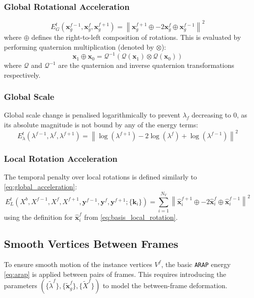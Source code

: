 \documentclass[a4paper,10pt]{article}
\newcommand{\mb}{\mathbf}
\begin{document}
\subsubsection*{Global Rotational Acceleration}
\begin{equation}
\label{eq:global_acceleration}
E^t_G(\mb{x}_g^{f-1}, \mb{x}_g^{f}, \mb{x}_g^{f+1}) = \left\| \mb{x}_g^{f+1} \oplus -2\mb{x}_g^{f} \oplus \mb{x}_g^{f-1} \right\|^2
\end{equation}
where $\oplus$ defines the right-to-left composition of rotations.
This is evaluated by performing quaternion multiplication (denoted by $\otimes$):
\begin{equation}
\mb{x}_1 \oplus \mb{x}_0 = \mathcal{Q}^{-1} \left( \mathcal{Q}(\mb{x}_1) \otimes \mathcal{Q}(\mb{x}_0) \right)
\end{equation}
where $\mathcal{Q}$ and $\mathcal{Q}^{-1}$ are the quaternion and inverse quaternion transformations respectively.

\subsubsection*{Global Scale}
Global scale change is penalised logarithmically to prevent $\lambda_f$ decreasing to 0, as its absolute magnitude is not bound by any of the energy terms:
\begin{equation}
\label{eq:global_scale}
E^t_\lambda(\lambda^{f-1}, \lambda^{f}, \lambda^{f+1}) = \left\| \log(\lambda^{f+1}) - 2 \log(\lambda^{f}) + \log(\lambda^{f-1}) \right\|^2
\end{equation}

\subsubsection*{Local Rotation Acceleration}
The temporal penalty over local rotations is defined similarly to \eqref{eq:global_acceleration}:
\begin{equation}
\label{eq:local_acceleration}
E^t_L(X^b, X^{f-1}, X^{f}, X^{f+1}, \mb{y}^{f-1}, \mb{y}^f, \mb{y}^{f+1} ; \{\mb{k}_i\}) = \sum_{i=1}^{N_V} \left\| \mb{\hat x}^{f+1}_i \oplus -2 \mb{\hat x}^{f}_i \oplus \mb{\hat x}^{f-1}_i \right\|^2
\end{equation}
using the definition for $\mb{\hat x}^{f}_i$ from \eqref{eq:basis_local_rotation}.

\subsection{Smooth Vertices Between Frames}
To ensure smooth motion of the instance vertices $V^f$, the basic \texttt{ARAP} energy \eqref{eq:arap} is applied between pairs of frames.
This requires introducing the parameters $(\{ {\tilde\lambda}^f \}, \{ \mb{\tilde x}^f_g \}, \{ {\tilde X}^f \})$ to model the between-frame deformation.
\end{document}
